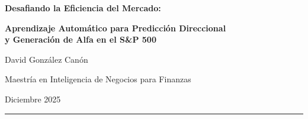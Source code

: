 \documentclass[11pt,a4paper]{article}
\begin{document}
\thispagestyle{empty}
\begin{center}

\vspace*{0.8cm}

{\LARGE\bfseries Desafiando la Eficiencia del Mercado:\par}
\vspace{0.5cm}
{\Large\bfseries Aprendizaje Automático para Predicción Direccional\\ y Generación de Alfa en el S\&P 500\par}

\vspace{1.2cm}

{\large David González Canón\par}
\vspace{0.4cm}
{\normalsize Maestría en Inteligencia de Negocios para Finanzas\par}
\vspace{0.2cm}
{\normalsize Diciembre 2025\par}

\vspace{1.2cm}

\noindent\rule{0.9\textwidth}{0.5pt}

\vspace{0.8cm}

\end{center}
\end{document}

